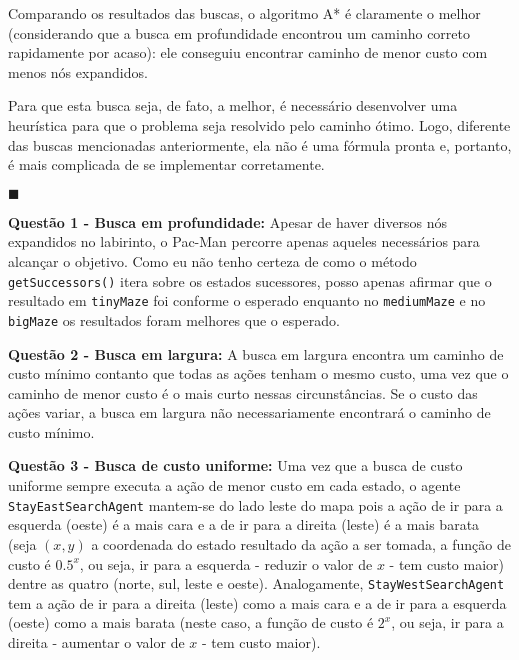 \documentclass{article}
\begin{document}
Comparando os resultados das buscas, o algoritmo A* é claramente o melhor (considerando que a busca em profundidade encontrou um caminho correto rapidamente por acaso): ele conseguiu encontrar caminho de menor custo com menos nós expandidos.

Para que esta busca seja, de fato, a melhor, é necessário desenvolver uma heurística para que o problema seja resolvido pelo caminho ótimo. Logo, diferente das buscas mencionadas anteriormente, ela não é uma fórmula pronta e, portanto, é mais complicada de se implementar corretamente.

\begin{flushright}
$\blacksquare$
\end{flushright}


\bigskip
{}

\bigskip
\qquad \textbf{Questão 1 - Busca em profundidade:} Apesar de haver diversos nós expandidos no labirinto, o Pac-Man percorre apenas aqueles necessários para alcançar o objetivo. Como eu não tenho certeza de como o método \texttt{getSuccessors()} itera sobre os estados sucessores, posso apenas afirmar que o resultado em \texttt{tinyMaze} foi conforme o esperado enquanto no \texttt{mediumMaze} e no \texttt{bigMaze} os resultados foram melhores que o esperado.

\bigskip
\qquad \textbf{Questão 2 - Busca em largura:} A busca em largura encontra um caminho de custo mínimo contanto que todas as ações tenham o mesmo custo, uma vez que o caminho de menor custo é o mais curto nessas circunstâncias. Se o custo das ações variar, a busca em largura não necessariamente encontrará o caminho de custo mínimo.

\bigskip
\qquad \textbf{Questão 3 - Busca de custo uniforme:} Uma vez que a busca de custo uniforme sempre executa a ação de menor custo em cada estado, o agente \texttt{StayEastSearchAgent} mantem-se do lado leste do mapa pois a ação de ir para a esquerda (oeste) é a mais cara e a de ir para a direita (leste) é a mais barata (seja $(x, y)$ a coordenada do estado resultado da ação a ser tomada, a função de custo é $0.5^{x}$, ou seja, ir para a esquerda - reduzir o valor de $x$ - tem custo maior) dentre as quatro (norte, sul, leste e oeste). Analogamente, \texttt{StayWestSearchAgent} tem a ação de ir para a direita (leste) como a mais cara e a de ir para a esquerda (oeste) como a mais barata (neste caso, a função de custo é $2^{x}$, ou seja, ir para a direita - aumentar o valor de $x$ - tem custo maior).
\end{document}
